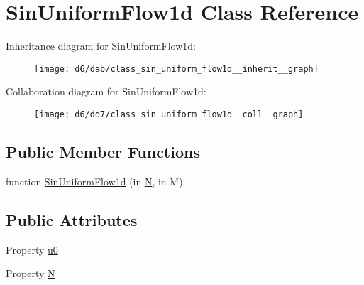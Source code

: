 \hypertarget{class_sin_uniform_flow1d}{}\section{Sin\+Uniform\+Flow1d Class Reference}
\label{class_sin_uniform_flow1d}


Inheritance diagram for Sin\+Uniform\+Flow1d\+:
\nopagebreak
\begin{figure}[H]
\begin{center}
\leavevmode
\texttt{[image: d6/dab/class\_sin\_uniform\_flow1d\_\_inherit\_\_graph]}
\end{center}
\end{figure}


Collaboration diagram for Sin\+Uniform\+Flow1d\+:
\nopagebreak
\begin{figure}[H]
\begin{center}
\leavevmode
\texttt{[image: d6/dd7/class\_sin\_uniform\_flow1d\_\_coll\_\_graph]}
\end{center}
\end{figure}
\subsection*{Public Member Functions}
\begin{DoxyCompactItemize}
\item 
function \hyperlink{class_sin_uniform_flow1d_a56071e9f2f78d321d90ec9442f289625}{Sin\+Uniform\+Flow1d} (in \hyperlink{class_sin_uniform_flow1d_a277cd527859a78c78442829d6dc15064}{N}, in M)
\end{DoxyCompactItemize}
\subsection*{Public Attributes}
\begin{DoxyCompactItemize}
\item 
Property \hyperlink{class_sin_uniform_flow1d_a6425bc53a05ec11b233e633763c83a47}{u0}
\item 
Property \hyperlink{class_sin_uniform_flow1d_a277cd527859a78c78442829d6dc15064}{N}
\end{DoxyCompactItemize}
